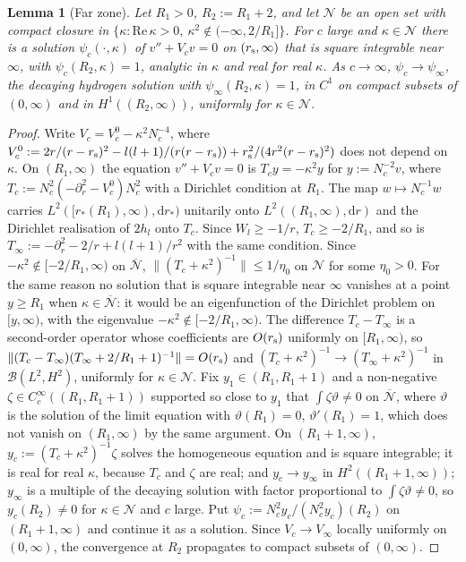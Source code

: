 \documentclass[%
 aip,
 jmp,
 amsmath,amssymb,
 reprint, onecolumn
]{revtex4-1}
\newtheorem{alemma}{Lemma}
\theoremstyle{definition}
\theoremstyle{remark}
\newcommand{\rmd}{\mathrm{d}}
\begin{document}
\begin{alemma}[Far zone]\label{lem:far}
Let $R_1>0$, $R_2:=R_1+2$, and let $\mathcal N$ be an open set with compact closure
in $\{\kappa:\mathrm{Re}\,\kappa>0,\ \kappa^2\notin(-\infty,2/R_1]\}$. For
$c$ large and $\kappa\in\mathcal N$ there is a solution $\psi_c(\cdot,\kappa)$ of
$v''+V_cv=0$ on $(r_{\rm s},\infty)$ that is square integrable near
$\infty$, with $\psi_c(R_2,\kappa)=1$, analytic in $\kappa$ and real for
real $\kappa$. As
$c\to\infty$, $\psi_c\to\psi_\infty$, the decaying hydrogen solution
with $\psi_\infty(R_2,\kappa)=1$, in $C^1$ on compact subsets of
$(0,\infty)$ and in $H^1((R_2,\infty))$, uniformly for $\kappa\in\mathcal N$.
\end{alemma}

\begin{proof}
Write $V_c=V_c^0-\kappa^2N_c^{-4}$, where
$V_c^0:=2r/(r-r_{\rm s})^2-l(l+1)/(r(r-r_{\rm s}))+r_{\rm s}^2/(4r^2(r-r_{\rm s})^2)$ does not
depend on $\kappa$. On $(R_1,\infty)$ the equation $v''+V_cv=0$ is
$T_cy=-\kappa^2y$ for $y:=N_c^{-2}v$, where
$T_c:=N_c^2(-\partial_r^2-V_c^0)N_c^2$ with a Dirichlet condition at $R_1$.
The map $w\mapsto N_c^{-1}w$ carries $L^2([r_*(R_1),\infty),\rmd r_*)$
unitarily onto $L^2((R_1,\infty),\rmd r)$ and the Dirichlet realisation
of $2h_l$ onto $T_c$. Since $W_l\geq-1/r$, $T_c\geq-2/R_1$, and so is
$T_\infty:=-\partial_r^2-2/r+l(l+1)/r^2$ with the same condition. Since
$-\kappa^2\notin[-2/R_1,\infty)$ on $\overline{\mathcal N}$,
$\|(T_c+\kappa^2)^{-1}\|\leq1/\eta_0$ on $\mathcal N$ for some $\eta_0>0$. For the same
reason no solution that is square integrable near $\infty$ vanishes at
a point $y\geq R_1$ when $\kappa\in\overline{\mathcal N}$: it would be an eigenfunction
of the Dirichlet problem on $[y,\infty)$, with the eigenvalue
$-\kappa^2\notin[-2/R_1,\infty)$. The difference $T_c-T_\infty$ is a second-order
operator whose coefficients are $O(r_{\rm s})$ uniformly on
$[R_1,\infty)$, so $\|(T_c-T_\infty)(T_\infty+2/R_1+1)^{-1}\|=O(r_{\rm s})$ and
$(T_c+\kappa^2)^{-1}\to(T_\infty+\kappa^2)^{-1}$ in
$\mathcal B(L^2,H^2)$, uniformly for $\kappa\in\mathcal N$. Fix $y_1\in(R_1,
R_1+1)$ and a non-negative $\zeta\in C_c^\infty((R_1,R_1+1))$ supported so
close to $y_1$ that $\int\zeta\vartheta\neq0$ on $\overline{\mathcal N}$, where $\vartheta$
is the solution of the limit equation with $\vartheta(R_1)=0$,
$\vartheta'(R_1)=1$, which does not vanish on $(R_1,\infty)$ by the same
argument. On $(R_1+1,\infty)$, $y_c:=(T_c+\kappa^2)^{-1}\zeta$ solves the
homogeneous equation and is square integrable; it is real for real
$\kappa$, because $T_c$ and $\zeta$ are real; and $y_c\to y_\infty$ in
$H^2((R_1+1,\infty))$; $y_\infty$ is a multiple of the decaying solution
with factor proportional to $\int\zeta\vartheta\neq0$, so $y_c(R_2)\neq0$
for $\kappa\in\mathcal N$ and $c$ large. Put $\psi_c:=N_c^2y_c/(N_c^2y_c)(R_2)$
on $(R_1+1,\infty)$ and continue it as a solution. Since $V_c\to V_\infty$
locally uniformly on $(0,\infty)$, the convergence at $R_2$ propagates
to compact subsets of $(0,\infty)$.
\end{proof}
\end{document}
